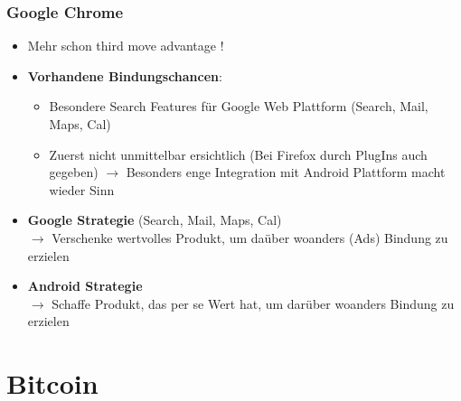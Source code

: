 \documentclass{article} %
\begin{document}
		\subsubsection{Google Chrome}
		\begin{itemize}
			\item Mehr schon third move advantage !
			\item \textbf{Vorhandene Bindungschancen}:
			\begin{itemize}
				\item Besondere Search Features für Google Web Plattform (Search, Mail, Maps, Cal)
				\item Zuerst nicht unmittelbar ersichtlich (Bei Firefox durch PlugIns auch gegeben) $\rightarrow$ Besonders enge Integration mit Android Plattform macht wieder Sinn
			\end{itemize}
			\item \textbf{Google Strategie} (Search, Mail, Maps, Cal)\\
				$\rightarrow$ Verschenke wertvolles Produkt, um daüber woanders (Ads) Bindung zu erzielen
				\item \textbf{Android Strategie}\\
				$\rightarrow$ Schaffe Produkt, das per se Wert hat, um darüber woanders Bindung zu erzielen
		\end{itemize}
		
		
	\section{Bitcoin}
\end{document}

